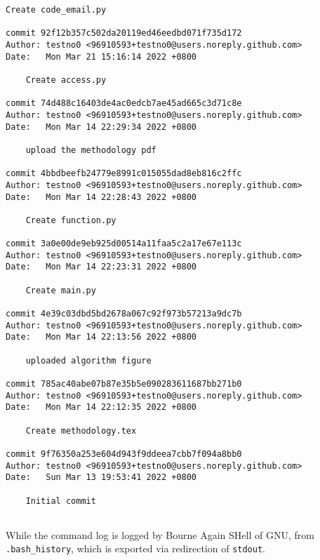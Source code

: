 \documentclass[12pt]{article}
\begin{document}
\begin{lstlisting}[caption={\texttt{git} log of the development.}]
	Create code_email.py

commit 92f12b357c502da20119ed46eedbd071f735d172
Author: testno0 <96910593+testno0@users.noreply.github.com>
Date:   Mon Mar 21 15:16:14 2022 +0800

	Create access.py

commit 74d488c16403de4ac0edcb7ae45ad665c3d71c8e
Author: testno0 <96910593+testno0@users.noreply.github.com>
Date:   Mon Mar 14 22:29:34 2022 +0800

	upload the methodology pdf

commit 4bbdbeefb24779e8991c015055dad8eb816c2ffc
Author: testno0 <96910593+testno0@users.noreply.github.com>
Date:   Mon Mar 14 22:28:43 2022 +0800

	Create function.py

commit 3a0e00de9eb925d00514a11faa5c2a17e67e113c
Author: testno0 <96910593+testno0@users.noreply.github.com>
Date:   Mon Mar 14 22:23:31 2022 +0800

	Create main.py

commit 4e39c03dbd5bd2678a067c92f973b57213a9dc7b
Author: testno0 <96910593+testno0@users.noreply.github.com>
Date:   Mon Mar 14 22:13:56 2022 +0800

	uploaded algorithm figure

commit 785ac40abe07b87e35b5e090283611687bb271b0
Author: testno0 <96910593+testno0@users.noreply.github.com>
Date:   Mon Mar 14 22:12:35 2022 +0800

	Create methodology.tex

commit 9f76350a253e604d943f9ddeea7cbb7f094a8bb0
Author: testno0 <96910593+testno0@users.noreply.github.com>
Date:   Sun Mar 13 19:53:41 2022 +0800

	Initial commit
	
\end{lstlisting}
\doublespacing

While the command log is logged by Bourne Again SHell of GNU, from \texttt{.bash\_history}, which is exported via redirection of \texttt{stdout}.
\end{document}
